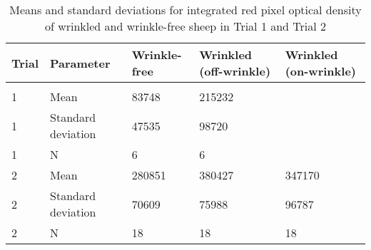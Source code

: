 %

\begin{table}[htp]
\centering
\captionsetup{width=0.8\textwidth}
\caption{Means and standard deviations for integrated red pixel optical density of wrinkled and wrinkle-free sheep in Trial 1 and Trial 2}
\label{tab:redpixelodmeans}
\begin{tabular}{|p{0.4in}|p{0.7in}|p{0.9in}|p{0.9in}|p{0.9in}|}  \hline
  \rule{0pt}{12pt}
     Trial & Parameter &  Wrinkle-free  &  Wrinkled (off-wrinkle) & Wrinkled (on-wrinkle)  \\ 
\hline \\
  1  & Mean &   83748        &   215232   &       \\
  1  & Standard deviation &   47535      &    98720   &  \\ 
  1  & N                  &       6      &        6   &   \\ \hline
  2  & Mean &   280851       &   380427    &  347170   \\ 
  2  & Standard deviation &    70609     &  75988  &  96787 \\ 
  2  & N                  &       18     &     18  &     18  \\ \hline
\end{tabular}
\end{table}

%
